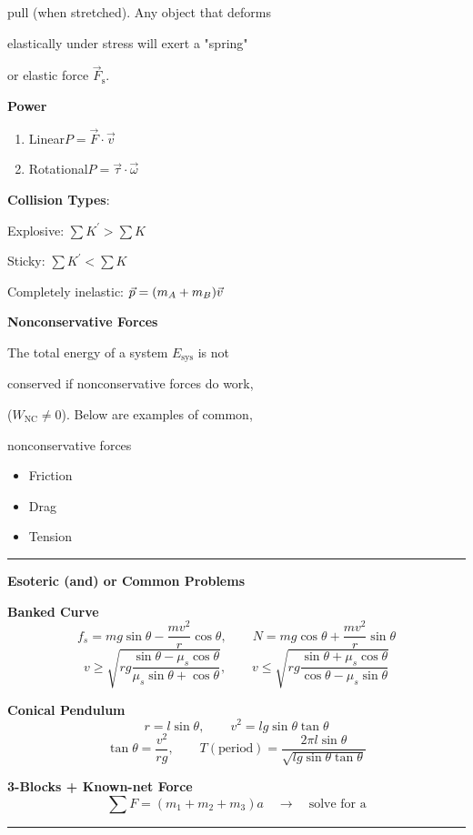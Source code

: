 \documentclass[	DIV=calc,%
							paper=a4,%
							fontsize=11pt,%
							twocolumn]{scrartcl} %
\newcommand{\hformbar}[1]{\vspace{5pt}\hrule\vspace{10pt}} %
\newcommand{\pvec}[1]{\vec{#1}\mkern2mu\vphantom{#1}}
\newcommand{\formdesc}[1]{\noindent\textbf{#1}}
\begin{document}
pull (when stretched). Any object that deforms 

elastically under stress will exert a "spring" 

or elastic force $\vec F_\text{s}$. 

\textbf{Power}
\begin{enumerate}
    \item Linear\qquad\qquad$P=\vec F\cdot\vec v$
    \item Rotational\qquad$P=\vec\tau\cdot\vec\omega$
\end{enumerate}

\textbf{Collision Types}:

\qquad Explosive: $\sum K^\prime > \sum K$

\qquad Sticky: $\sum K^\prime < \sum K$

\qquad Completely inelastic: $\vec p = (m_A+m_B)\pvec{v}$

\textbf{Nonconservative Forces}

The total energy of a system $E_\text{sys}$ is not 

conserved if nonconservative forces do work, 

($W_{\text{NC}}\ne 0$). Below are examples of common, 

nonconservative forces
\begin{itemize}
    \item Friction
    \item Drag
    \item Tension
\end{itemize}
\hformbar{}

\formdesc{Esoteric (and) or Common Problems}

\textbf{Banked Curve}
$$f_s=mg\sin\theta-\frac{mv^2}{r}\cos\theta,\qquad N=mg\cos\theta+\frac{mv^2}{r}\sin\theta$$
$$v\ge\sqrt{rg\frac{\sin\theta-\mu_s\cos\theta}{\mu_s\sin\theta+\cos\theta}},\qquad v\le\sqrt{rg\frac{\sin\theta+\mu_s\cos\theta}{\cos\theta-\mu_s\sin\theta}}$$

\textbf{Conical Pendulum}
$$r=l\sin\theta,\qquad v^2=lg\sin\theta\tan\theta$$
$$\tan\theta=\frac{v^2}{rg},\qquad T(\text{period})=\frac{2\pi l\sin\theta}{\sqrt{lg\sin\theta\tan\theta}}$$

\textbf{3-Blocks + Known-net Force}
$$\sum F=(m_1+m_2+m_3)a\quad\rightarrow\quad\text{solve for a}$$
\hformbar{}

\textbf{}
\end{document}
